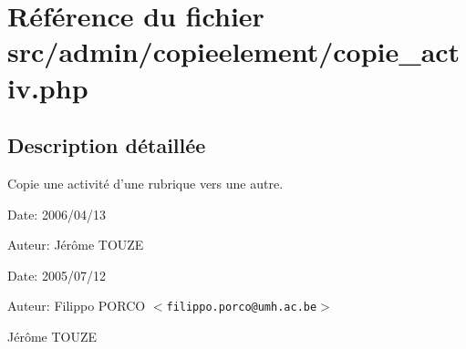 \section{Référence du fichier src/admin/copieelement/copie\_\-activ.php}
\label{copie__activ_8php}


\subsection{Description détaillée}
Copie une activité d'une rubrique vers une autre. 

\begin{Desc}
\item[Date:]2006/04/13\end{Desc}
\begin{Desc}
\item[Auteur:]Jérôme TOUZE\end{Desc}
\begin{Desc}
\item[Date:]2005/07/12\end{Desc}
\begin{Desc}
\item[Auteur:]Filippo PORCO $<${\tt filippo.porco@umh.ac.be}$>$ 

Jérôme TOUZE \end{Desc}


